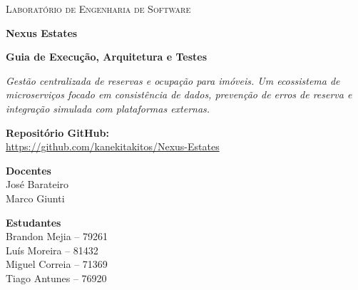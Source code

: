 \documentclass[11pt,a4paper]{article}
\begin{document}
\begin{titlepage}
    \centering
    \vspace*{2cm}
    
    {\Large \textsc{Laboratório de Engenharia de Software} \par}
    
    \vspace{3cm}
    
    {\Huge \textbf{Nexus Estates} \par}
    \vspace{0.5cm}
    {\Large \textbf{Guia de Execução, Arquitetura e Testes} \par}
    
    \vspace{1.5cm}
    
    {\normalsize \textit{Gestão centralizada de reservas e ocupação para imóveis. Um ecossistema de microserviços focado em consistência de dados, prevenção de erros de reserva e integração simulada com plataformas externas.} \par}
    
    \vspace{1.5cm}
    
    \textbf{Repositório GitHub:} \\
    \url{https://github.com/kanekitakitos/Nexus-Estates}
    
    \vfill
    
    \begin{minipage}[t]{0.45\textwidth}
        \begin{flushleft}
            \large \textbf{Docentes} \\
            \normalsize
            José Barateiro \\
            Marco Giunti
        \end{flushleft}
    \end{minipage}
    \hfill
    \begin{minipage}[t]{0.5\textwidth}
        \begin{flushright}
            \large \textbf{Estudantes} \\
            \normalsize
            Brandon Mejia -- 79261 \\
            Luís Moreira -- 81432 \\
            Miguel Correia -- 71369 \\
            Tiago Antunes -- 76920
        \end{flushright}
    \end{minipage}
    
    \vspace{2cm}
\end{titlepage}

\tableofcontents
\newpage



\newpage




\newpage


\newpage


\end{document}
